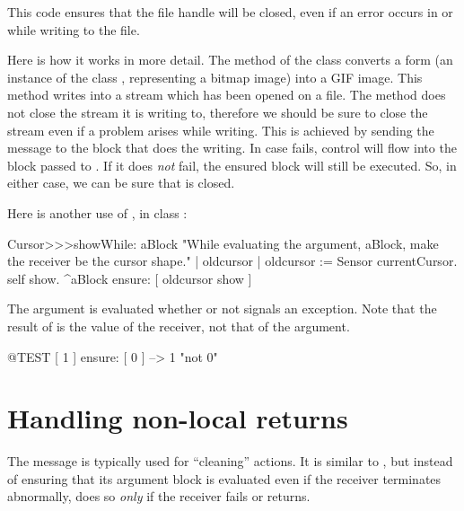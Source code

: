 \noindent
This code ensures that the  file handle will be closed, even if an error occurs in  or while writing to the file.

Here is how it works in more detail.
The  method of the class  converts a form (\ie an instance of the class , representing a bitmap image) into a GIF image. This method writes into a stream which has been opened on a file. The  method does not close the stream it is writing to, therefore we should be sure to close the stream even if a problem arises while writing. This is achieved by sending the message  to the block that does the writing. In case  fails, control will flow into the block passed to .  If it does \emph{not} fail, the ensured block will still be executed.  So, in either case, we can be sure that  is closed.

Here is another use of , in class :


\begin{code}{}
Cursor>>>showWhile: aBlock 
	"While evaluating the argument, aBlock,
	make the receiver be the cursor shape."
	| oldcursor |
	oldcursor := Sensor currentCursor.
	self show.
	^aBlock ensure: [ oldcursor show ]
\end{code}

The argument  is evaluated whether or not   signals an exception. Note that the result of  is the value of the receiver, not that of the argument.

\begin{code}{@TEST}
[ 1 ] ensure: [ 0 ] --> 1    "not 0"
\end{code}

\section{Handling non-local returns}

The message  is typically used for ``cleaning'' actions. It is similar to , but instead of ensuring that its argument block is evaluated even if the receiver terminates abnormally,  does so \emph{only} if the receiver fails or returns.

